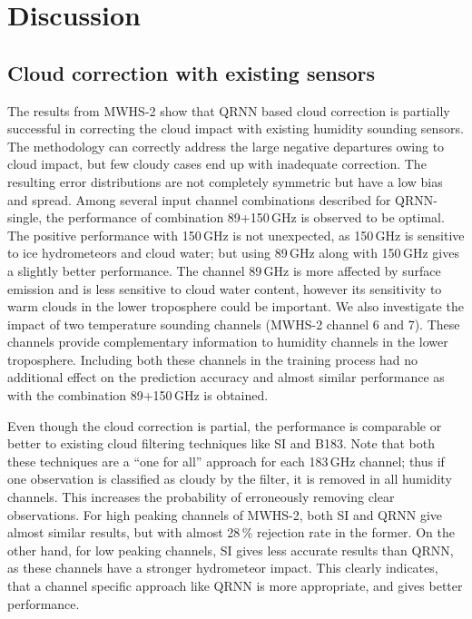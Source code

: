 \documentclass[amt, manuscript]{copernicus}
\begin{document}
\section{Discussion}
\label{discussions}

\subsection{Cloud correction with existing sensors}
%
The results from MWHS-2 show that QRNN based cloud correction is partially successful in correcting the cloud impact with existing humidity sounding sensors. The methodology can correctly address the large negative departures owing to cloud impact, but few cloudy cases end up with inadequate correction. The resulting error distributions are not completely symmetric but have a low bias and spread. Among several input channel combinations described for QRNN-single, the performance of combination 89+150\,GHz is observed to be optimal. The positive performance with 150\,GHz is not unexpected, as 150\,GHz is sensitive to ice hydrometeors and cloud water; but using 89\,GHz along with 150\,GHz gives a slightly better performance. The channel 89\,GHz is more affected by surface emission and is less sensitive to cloud water content, however its sensitivity to warm clouds in the lower troposphere could be important. We also investigate the impact of two temperature sounding channels (MWHS-2 channel 6 and 7). These channels provide complementary information to humidity channels in the lower troposphere. Including both these channels in the training process had no additional effect on the prediction accuracy and almost similar performance as with the combination 89+150\,GHz is obtained. 

Even though the cloud correction is partial, the performance is comparable or better to existing cloud filtering techniques like SI and B183. Note that both these techniques are a ``one for all'' approach for each 183\,GHz channel; thus if one observation is classified as cloudy by the filter, it is removed in all humidity channels. This increases the probability of erroneously removing clear observations. For high peaking channels of MWHS-2, both SI and QRNN give almost similar results, but with almost 28\,\% rejection rate in the former. On the other hand, for low peaking channels, SI gives less accurate results than QRNN, as these channels have a stronger hydrometeor impact. This clearly indicates, that a channel specific approach like QRNN is more appropriate, and gives better performance. 
\end{document}
